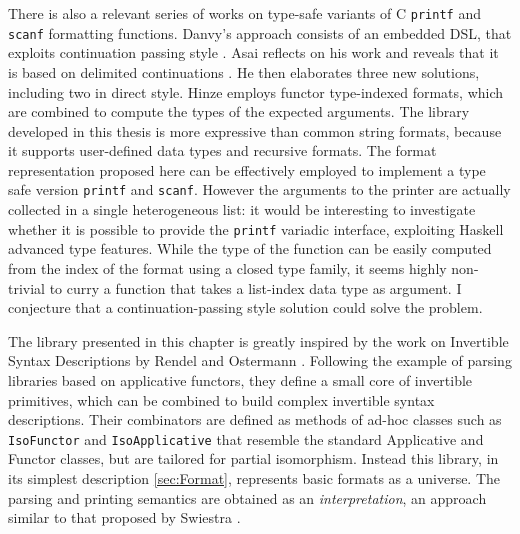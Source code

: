 \documentclass[../Thesis.tex]{subfiles}
\begin{document}
There is also a relevant series of works on type-safe variants of 
C \texttt{printf} and \texttt{scanf} formatting functions.
Danvy's approach consists of an embedded DSL, that exploits continuation
passing style \cite{Danvy}.
Asai reflects on his work and reveals that it is based on delimited continuations \cite{Asai}. He then elaborates three new solutions, including
two in direct style.
Hinze employs functor type-indexed formats, which are combined to
compute the types of the expected arguments.
The library developed in this thesis is more expressive than 
common string formats, because it supports user-defined data types and
recursive formats. 
The format representation proposed here can be effectively employed to implement a type safe version \texttt{printf} and \texttt{scanf}.
However the arguments to the printer are actually collected in a single heterogeneous list: it would be interesting to investigate whether it is possible
to provide the \texttt{printf} variadic interface, exploiting
Haskell advanced type features. While the type of the function
can be easily computed from the index of the format using a closed type family, it seems highly non-trivial to curry a function that takes a list-index
data type as argument. I conjecture that a continuation-passing style solution
could solve the problem.

The library presented in this chapter is greatly inspired by the
work on Invertible Syntax Descriptions by Rendel and Ostermann \cite{Rendel10ISD}.
Following the example of parsing libraries based on applicative functors, 
they define a small core of invertible primitives,
which can be combined to build complex invertible syntax descriptions.
Their combinators are defined as methods of ad-hoc classes 
such as \texttt{IsoFunctor} and \texttt{IsoApplicative} that
resemble the standard Applicative and Functor classes, but
are tailored for partial isomorphism.
Instead this library, in its simplest description \ref{sec:Format}, 
represents basic formats as a universe.
The parsing and printing semantics are obtained as an \emph{interpretation}, an approach similar to that proposed by Swiestra \cite{PowerOfPi}.
\end{document}

